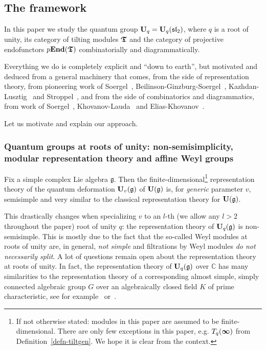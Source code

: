 \subsection{The framework}\label{sub-intropart1}

In this paper we study the quantum group 
$\boldsymbol{\mathrm{U}}_q=\boldsymbol{\mathrm{U}}_q(\mathfrak{sl}_2)$, where $q$ is 
a root of unity, its category of 
tilting modules $\boldsymbol{\mathfrak{T}}$ and the category 
of projective endofunctors $p\boldsymbol{\mathrm{End}}(\boldsymbol{\mathfrak{T}})$ 
combinatorially and diagrammatically.




Everything we do is completely explicit and ``down to earth'', 
but motivated and deduced from a general machinery that 
comes, from the side of representation theory, from 
pioneering work of Soergel~\cite{soe1}, 
Beilinson-Ginzburg-Soergel~\cite{bgs}, 
Kazhdan-Lusztig~\cite{kalu} and 
Stroppel~\cite{st2}, and from the side of 
combinatorics and diagrammatics, from work of
Soergel~\cite{soe2}, Khovanov-Lauda~\cite{kl5} 
and Elias-Khovanov~\cite{ek1}.



Let us motivate and explain our approach.




\subsubsection{Quantum groups at roots of unity: non-semisimplicity, modular representation theory and affine Weyl groups}\label{subsub-intropart1}
Fix a simple complex Lie algebra $\mathfrak{g}$. 
Then the finite-dimensional\footnote{If not otherwise stated: 
modules in this paper are assumed to be finite-dimensional. 
There are only few exceptions in this paper, e.g. $T_q({\boldsymbol{\infty}})$ 
from Definition~\ref{defn-tiltgen}. We hope it is clear from the context.} representation 
theory of the quantum deformation $\boldsymbol{\mathrm{U}}_v(\mathfrak{g})$ 
of $\boldsymbol{\mathrm{U}}(\mathfrak{g})$ is, for \textit{generic} parameter $v$, 
semisimple and very similar to the classical representation theory for $\boldsymbol{\mathrm{U}}(\mathfrak{g})$.



This drastically changes when specializing $v$ 
to an $l$-th (we allow any $l>2$ throughout the paper) 
root of unity $q$: the representation theory 
of $\boldsymbol{\mathrm{U}}_q(\mathfrak{g})$ is non-semisimple. 
This is mostly due to the fact that the so-called 
Weyl modules at roots of unity are, in 
general, \textit{not simple} and filtrations by 
Weyl modules \textit{do not necessarily split}. 
A lot of questions remain open about the 
representation theory at roots of unity. 
In fact, the representation 
theory of $\boldsymbol{\mathrm{U}}_q(\mathfrak{g})$ over $\mathbb{C}$ has 
many similarities to the representation theory 
of a corresponding almost simple, simply connected 
algebraic group $G$ over an algebraically closed 
field $K$ of prime characteristic, see 
for example~\cite{ajs} or~\cite{lu1}.



